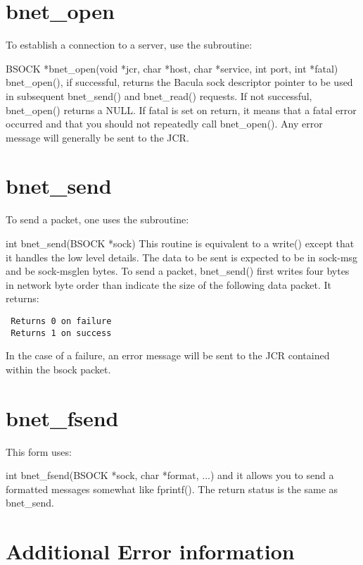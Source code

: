 \section{bnet\_open}

To establish a connection to a server, use the subroutine: 

BSOCK *bnet\_open(void *jcr, char *host, char *service, int port,  int *fatal)
bnet\_open(), if successful, returns the Bacula sock descriptor pointer to be
used in subsequent bnet\_send() and bnet\_read() requests. If not successful,
bnet\_open() returns a NULL. If fatal is set on return, it means that a fatal
error occurred and that you should not repeatedly call bnet\_open(). Any error
message will generally be sent to the JCR. 

\section{bnet\_send}

To send a packet, one uses the subroutine: 

int bnet\_send(BSOCK *sock) This routine is equivalent to a write() except
that it handles the low level details. The data to be sent is expected to be
in sock-\gt{}msg and be sock-\gt{}msglen bytes. To send a packet, bnet\_send()
first writes four bytes in network byte order than indicate the size of the
following data packet. It returns: 

\footnotesize
\begin{verbatim}
 Returns 0 on failure
 Returns 1 on success
\end{verbatim}
\normalsize

In the case of a failure, an error message will be sent to the JCR contained
within the bsock packet. 

\section{bnet\_fsend}

This form uses: 

int bnet\_fsend(BSOCK *sock, char *format, ...) and it allows you to send a
formatted messages somewhat like fprintf(). The return status is the same as
bnet\_send. 

\section{Additional Error information}

